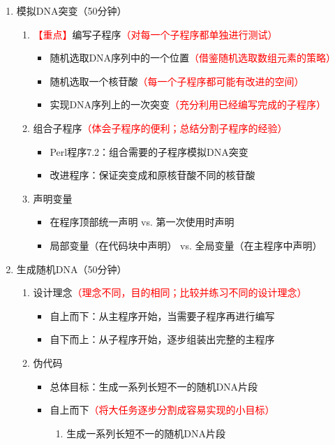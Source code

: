 \documentclass{TIJMUjiaoanLL}
\begin{document}
\begin{enumerate}
  \item 模拟DNA突变（50分钟）
    \begin{enumerate}
      \item \textcolor{red}{【重点】}编写子程序\textcolor{red}{（对每一个子程序都单独进行测试）}
	\begin{itemize}
	  \item 随机选取DNA序列中的一个位置\textcolor{red}{（借鉴随机选取数组元素的策略）}
	  \item 随机选取一个核苷酸\textcolor{red}{（每一个子程序都可能有改进的空间）}
	  \item 实现DNA序列上的一次突变\textcolor{red}{（充分利用已经编写完成的子程序）}
	\end{itemize}
      \item 组合子程序\textcolor{red}{（体会子程序的便利；总结分割子程序的经验）}
	\begin{itemize}
	  \item Perl程序7.2：组合需要的子程序模拟DNA突变
          \item 改进程序：保证突变成和原核苷酸不同的核苷酸
	\end{itemize}
      \item 声明变量
	\begin{itemize}
	  \item 在程序顶部统一声明 vs. 第一次使用时声明
	  \item 局部变量（在代码块中声明） vs. 全局变量（在主程序中声明）
	\end{itemize}
    \end{enumerate}
  \item 生成随机DNA（50分钟）
    \begin{enumerate}
      \item 设计理念\textcolor{red}{（理念不同，目的相同；比较并练习不同的设计理念）}
	\begin{itemize}
	  \item 自上而下：从主程序开始，当需要子程序再进行编写
	  \item 自下而上：从子程序开始，逐步组装出完整的主程序
	\end{itemize}
      \item 伪代码
	\begin{itemize}
	  \item 总体目标：生成一系列长短不一的随机DNA片段
	  \item 自上而下\textcolor{red}{（将大任务逐步分割成容易实现的小目标）}
	    \begin{enumerate}
	      \item 生成一系列长短不一的随机DNA片段

\end{enumerate}
\end{itemize}
\end{enumerate}
\end{enumerate}
\end{document}
